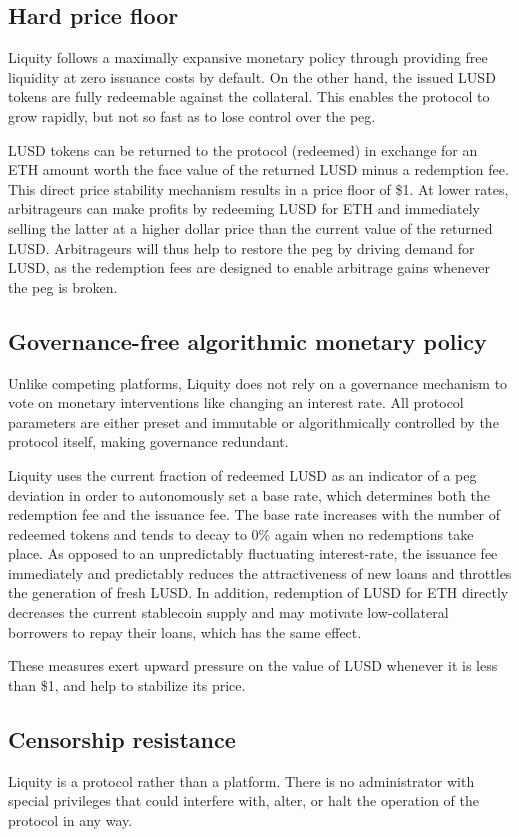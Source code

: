 \documentclass{article}
\begin{document}
\subsection{Hard price floor}
Liquity follows a maximally expansive monetary policy through providing free liquidity at zero issuance costs by default. On the other hand, the issued LUSD tokens are fully redeemable against the collateral. This enables the protocol to grow rapidly, but not so fast as to lose control over the peg.

LUSD tokens can be returned to the protocol (redeemed) in exchange for an ETH amount worth the face value of the returned LUSD minus a redemption fee. This direct price stability mechanism results in a price floor of \$1. At lower rates, arbitrageurs can make profits by redeeming LUSD for ETH and immediately selling the latter at a higher dollar price than the current value of the returned LUSD. Arbitrageurs will thus help to restore the peg by driving demand for LUSD, as the redemption fees are designed to enable arbitrage gains whenever the peg is broken.

\subsection{Governance-free algorithmic monetary policy}
Unlike competing platforms, Liquity does not rely on a governance mechanism to vote on monetary interventions like changing an interest rate. All protocol parameters are either preset and immutable or algorithmically controlled by the protocol itself, making governance redundant.

Liquity uses the current fraction of redeemed LUSD as an indicator of a peg deviation in order to autonomously set a base rate, which determines both the redemption fee and the issuance fee. The base rate increases with the number of redeemed tokens and tends to decay to 0\% again when no redemptions take place. As opposed to an unpredictably fluctuating interest-rate, the issuance fee immediately and predictably reduces the attractiveness of new loans and throttles the generation of fresh LUSD. In addition, redemption of LUSD for ETH directly decreases the current stablecoin supply and may motivate low-collateral borrowers to repay their loans, which has the same effect. 

These measures exert upward pressure on the value of LUSD whenever it is less than \$1, and help to stabilize its price.

\subsection{Censorship resistance}
Liquity is a protocol rather than a platform. There is no administrator with special privileges that could interfere with, alter, or halt the operation of the protocol in any way.
\end{document}
